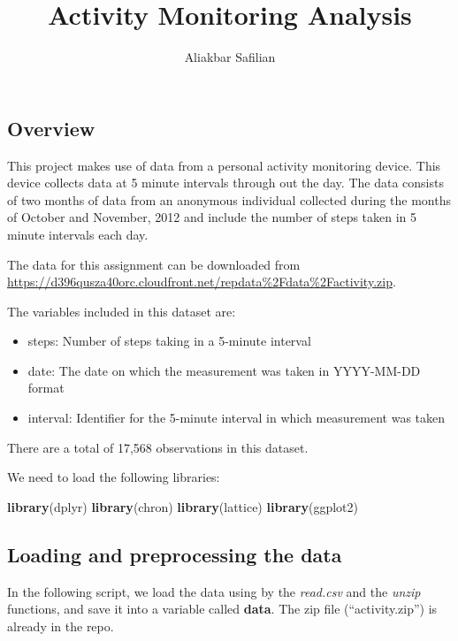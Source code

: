 \documentclass[]{article}
\title{Activity Monitoring Analysis}
\author{Aliakbar Safilian}
\date{}
\newenvironment{Shaded}{\begin{snugshade}}{\end{snugshade}}
\newcommand{\KeywordTok}[1]{\textcolor[rgb]{0.13,0.29,0.53}{\textbf{#1}}}
\newcommand{\NormalTok}[1]{#1}
\providecommand{\tightlist}{%
  \setlength{\itemsep}{0pt}\setlength{\parskip}{0pt}}
\begin{document}
\maketitle

\subsection{Overview}\label{overview}

This project makes use of data from a personal activity monitoring
device. This device collects data at 5 minute intervals through out the
day. The data consists of two months of data from an anonymous
individual collected during the months of October and November, 2012 and
include the number of steps taken in 5 minute intervals each day.

The data for this assignment can be downloaded from
\url{https://d396qusza40orc.cloudfront.net/repdata\%2Fdata\%2Factivity.zip}.

The variables included in this dataset are:

\begin{itemize}
\tightlist
\item
  steps: Number of steps taking in a 5-minute interval\\
\item
  date: The date on which the measurement was taken in YYYY-MM-DD format
\item
  interval: Identifier for the 5-minute interval in which measurement
  was taken
\end{itemize}

There are a total of 17,568 observations in this dataset.

We need to load the following libraries:

\begin{Shaded}
\begin{Highlighting}[]
\KeywordTok{library}\NormalTok{(dplyr)}
\KeywordTok{library}\NormalTok{(chron)}
\KeywordTok{library}\NormalTok{(lattice)}
\KeywordTok{library}\NormalTok{(ggplot2)}
\end{Highlighting}
\end{Shaded}

\subsection{Loading and preprocessing the
data}\label{loading-and-preprocessing-the-data}

In the following script, we load the data using by the \emph{read.csv}
and the \emph{unzip} functions, and save it into a variable called
\textbf{data}. The zip file (``activity.zip'') is already in the repo.
\end{document}
